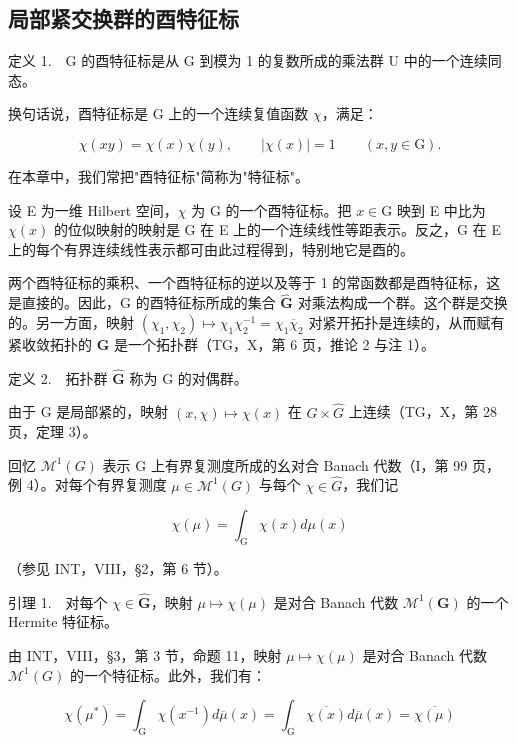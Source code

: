 \subsection{局部紧交换群的酉特征标}

定义 1.　G 的酉特征标是从 G 到模为 1 的复数所成的乘法群 U 中的一个连续同态。

换句话说，酉特征标是 G 上的一个连续复值函数 \(\chi\)，满足：

\[
\chi (x y) = \chi (x) \chi (y), \qquad | \chi (x) | = 1 \qquad (x, y \in \mathrm{G}).
\]

在本章中，我们常把"酉特征标"简称为"特征标"。

设 E 为一维 Hilbert 空间，\(\chi\) 为 G 的一个酉特征标。把 \(x \in \mathrm{G}\) 映到 E 中比为 \(\chi(x)\) 的位似映射的映射是 G 在 E 上的一个连续线性等距表示。反之，G 在 E 上的每个有界连续线性表示都可由此过程得到，特别地它是酉的。

两个酉特征标的乘积、一个酉特征标的逆以及等于 1 的常函数都是酉特征标，这是直接的。因此，G 的酉特征标所成的集合 \(\widehat{\mathbf{G}}\) 对乘法构成一个群。这个群是交换的。另一方面，映射 \((\chi_1,\chi_2)\mapsto \chi_1\chi_2^{-1} = \chi_1\overline{\chi}_2\) 对紧开拓扑是连续的，从而赋有紧收敛拓扑的 \(\widehat{\mathbf{G}}\) 是一个拓扑群（TG，X，第 6 页，推论 2 与注 1）。

定义 2.　拓扑群 \(\widehat{\mathbf{G}}\) 称为 G 的对偶群。

由于 G 是局部紧的，映射 \((x,\chi)\mapsto\chi(x)\) 在 \(G\times\widehat{G}\) 上连续（TG，X，第 28 页，定理 3）。

回忆 \(\mathcal{M}^{1}(G)\) 表示 G 上有界复测度所成的幺对合 Banach 代数（I，第 99 页，例 4）。对每个有界复测度 \(\mu\in\mathcal{M}^{1}(G)\) 与每个 \(\chi\in\widehat{G}\)，我们记

\[
\chi (\mu) = \int_ {\mathrm{G}} \chi (x) d \mu (x)\tag{1}
\]

（参见 INT，VIII，§2，第 6 节）。

引理 1.　对每个 \(\chi \in \widehat{\mathbf{G}}\)，映射 \(\mu \mapsto \chi(\mu)\) 是对合 Banach 代数 \(\mathcal{M}^1(\mathbf{G})\) 的一个 Hermite 特征标。

由 INT，VIII，§3，第 3 节，命题 11，映射 \(\mu \mapsto \chi(\mu)\) 是对合 Banach 代数 \(\mathcal{M}^{1}(G)\) 的一个特征标。此外，我们有：

\[
\chi (\mu^ {*}) = \int_ {\mathrm{G}} \chi (x ^ {- 1}) d \overline {{\mu}} (x) = \int_ {\mathrm{G}} \overline {{\chi (x)}} d \overline {{\mu}} (x) = \overline {{\chi (\mu)}}
\]

